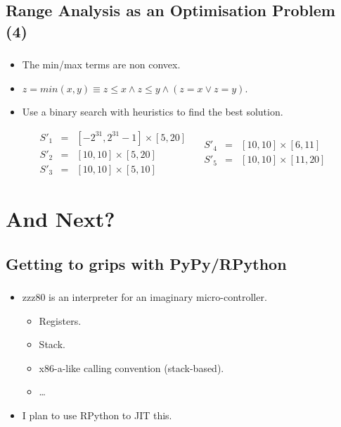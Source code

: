 \documentclass[compress]{beamer}
\begin{document}
\subsection{Range Analysis as an Optimisation Problem (4)}
\begin{frame}[fragile]
	\frametitle{\insertsubsection}

\begin{itemize}
\item The min/max terms are non convex.
\vfill
\item $z = min(x, y) \equiv z \leq x \wedge z \leq y \wedge (z = x \vee z = y)$.
\vfill
\item Use a binary search with heuristics to find the best solution.
\end{itemize}

\vfill

\[
\begin{array}{rcl}
S'_1 & = & [-2^{31}, 2^{31} - 1] \times [5, 20] \\
S'_2 & = & [10, 10] \times [5, 20] \\
S'_3 & = & [10, 10] \times [5, 10]
\end{array}
\quad
\begin{array}{rcl}
S'_4 & = & [10, 10] \times [6, 11] \\
S'_5 & = & [10, 10] \times [11, 20]
\end{array}
\]

\end{frame}

\section{And Next?}

\begin{frame}
  \sectionpage
\end{frame}


\subsection{Getting to grips with PyPy/RPython}
\begin{frame}[fragile]
	\frametitle{\insertsubsection}

	\begin{itemize}
	\item zzz80 is an interpreter for an imaginary micro-controller.
		\begin{itemize}
			\item Registers.
			\item Stack.
			\item x86-a-like calling convention (stack-based).
			\item \ldots
		\end{itemize}
		\vfill
	\item I plan to use RPython to JIT this.
	\end{itemize}
\end{frame}
\end{document}
